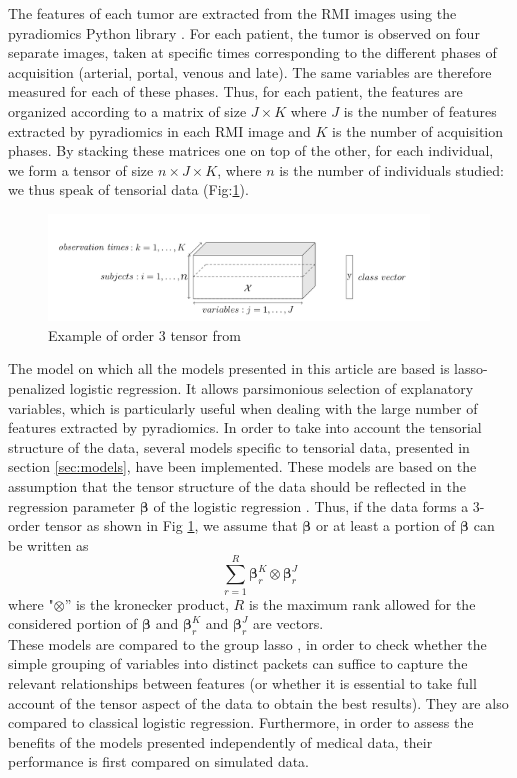 \documentclass[preprint,12pt]{elsarticle}
\begin{document}
\indent The features of each tumor are extracted from the RMI images using the pyradiomics Python library \cite{pyradio}. For each patient, the tumor is observed on four separate images, taken at specific times corresponding to the different phases of acquisition (arterial, portal, venous and late). The same variables are therefore measured for each of these phases. Thus, for each patient, the features are organized according to a matrix of size $J \times K$ where $J$ is the number of features extracted by pyradiomics in each RMI image and $K$ is the number of acquisition phases. By stacking these matrices one on top of the other, for each individual, we form a tensor of size $n \times J \times K$, where $n$ is the number of individuals studied: we thus speak of tensorial data (Fig:\ref{fig:tensor}).\\
\begin{figure}[tbp]
    \includegraphics[width=0.9\textwidth]{images/tensor.png}
    \caption{Example of order 3 tensor from \cite{multi_rank_r}}
    \label{fig:tensor}
\end{figure}
\indent The model on which all the models presented in this article are based is lasso-penalized logistic regression. It allows parsimonious selection of explanatory variables, which is particularly useful when dealing with the large number of features extracted by pyradiomics. In order to take into account the tensorial structure of the data, several models specific to tensorial data, presented in section \ref{sec:models}, have been implemented.
These models are based on the assumption that the tensor structure of the data should be reflected in the regression parameter $\bm{\beta}$ of the logistic regression \cite{multi_rank_1,multi_rank_r}. Thus, if the data forms a $3$-order tensor as shown in Fig \ref{fig:tensor}, we assume that $\bm{\beta}$ or at least a portion of $\bm{\beta}$ can be written as 
\begin{equation}
\sum\limits_{r = 1}^R \bm{\beta}_r^K \otimes  \bm{\beta}_r^J
\end{equation}
\noindent where "$\otimes $” is the kronecker product, $R$ is the maximum rank allowed for the considered portion of $\bm{\beta}$ and $\bm{\beta}_r^K$ and $\bm{\beta}_r^J$ are vectors.\\
\indent These models are compared to the group lasso \cite{grp_lasso}, in order to check whether the simple grouping of variables into distinct packets can suffice to capture the relevant relationships between features (or whether it is essential to take full account of the tensor aspect of the data to obtain the best results). They are also compared to classical logistic regression. Furthermore, in order to assess the benefits of the models presented independently of medical data, their performance is first compared on simulated data.
\end{document}
